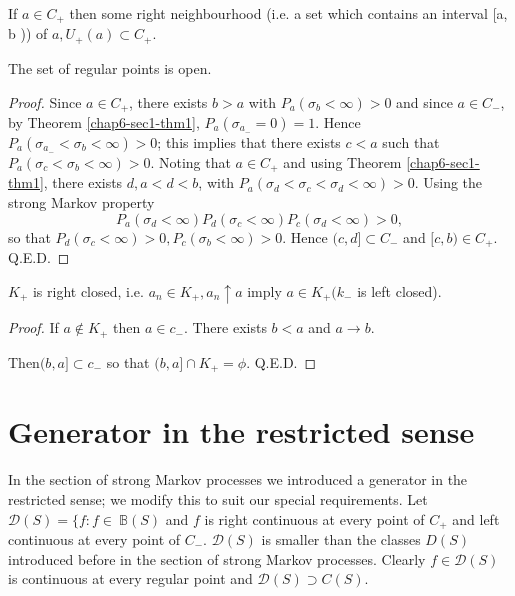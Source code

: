 \begin{coro*}
If $a \in C_+$ then some right neighbourhood (i.e. a set which
contains an interval [a, b )) of  $a, U_+ (a) \subset C_+$. 
\end{coro*}

\begin{thm}\label{chap6-sec1-thm3}%
The set of regular points is open.
\end{thm}

\begin{proof}
 Since $a \in C_+$, there exists $b > a $ with $P_a (\sigma_b <
  \infty) > 0$ and since $a \in C_-$, by Theorem
  \ref{chap6-sec1-thm1}, $P_a (\sigma_{a_-} 
  = 0) = 1$. Hence $P_a (\sigma_{a_-} < \sigma_b < \infty)> 0$; this
  implies that there exists $c < a$ such that $P_a (\sigma_c <
  \sigma_b < \infty)> 0$. Noting that $a \in C_+$ and using Theorem
  \ref{chap6-sec1-thm1}, there exists $d, a < d < b$, with $P_a
  (\sigma_d < \sigma_c < \sigma_d < \infty) > 0$. Using the strong
  Markov property  
  $$
  P_a (\sigma_d < \infty ) P_d (\sigma_c < \infty) P_c (\sigma_d < \infty ) > 0,
  $$
  so that $P_d (\sigma_c < \infty) > 0, P_c(\sigma_b < \infty )>
  0$. Hence $(c, d] \subset C_-$ and $[c, b) \in C_+$. \qquad Q.E.D.  
\end{proof}

\begin{thm}\label{chap6-sec1-thm4}%
  $K_+$ is right closed, i.e. $a_n \in K_+, a_n \uparrow a $ imply
  $a \in K_+ (k_-$ is left closed). 
\end{thm}

\begin{proof}
If $a \notin K_+$ then $a \in c_-$. There exists $b < a$ and $a
\rightarrow b$.  

Then\pageoriginale $(b, a] \subset c_- $ so that $ (b, a] \cap K_+ =
    \phi$. \qquad Q.E.D. 
\end{proof}

\section{Generator in the restricted sense}\label{chap6-sec2}%

In the section of strong Markov processes we introduced a generator in
the restricted sense; we modify this to suit our special
requirements. Let $\mathscr{D}(S) = \{ f : f \in \ \mathbb{B} (S)$ and
$f$ is right continuous at every point of $C_+$ and left continuous at
every point of $C_-$. $\mathscr{D}(S)$ is smaller than the classes
$D(S)$ introduced before in the section of strong Markov
processes. Clearly $f \in \mathscr{D}(S)$ is continuous at every
regular point and $\mathscr{D}(S) \supset C (S)$. 

